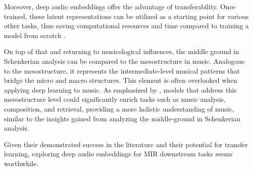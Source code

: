 Moreover, deep audio embeddings offer the advantage of transferability. Once trained, these latent representations can be utilized as a starting point for various other tasks, thus saving computational resources and time compared to training a model from scratch \cite{HamelTransferSimilarity}.

On top of that and returning to musicological influences, the middle ground in Schenkerian analysis can be compared to the mesostructure in music. Analogous to the mesostructure, it represents the intermediate-level musical patterns that bridge the micro and macro structures. This element is often overlooked when applying deep learning to music. As emphasized by \cite{Mesostructures2023}, models that address this mesostructure level could significantly enrich tasks such as music analysis, composition, and retrieval, providing a more holistic understanding of music, similar to the insights gained from analyzing the middle-ground in Schenkerian analysis. \cite{Introduction_to_Schenkerian_Analysis}

Given their demonstrated success in the literature and their potential for transfer learning, exploring deep audio embeddings for MIR downstream tasks seems worthwhile.
